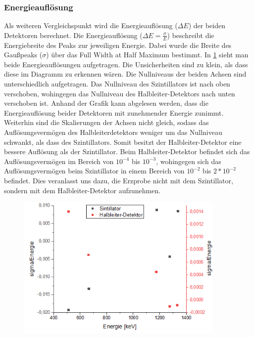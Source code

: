 \subsubsection{Energieauflösung}
Als weiteren Vergleichspunkt wird die Energieauflösung ($\Delta E$) der beiden Detektoren berechnet.
Die Energieauflösung ($\Delta E = \frac{\sigma}{E}$) beschreibt die Energiebreite des Peaks zur jeweiligen Energie. Dabei wurde die Breite des Gaußpeaks ($\sigma$) über das Full Width at Half Maximum bestimmt.
In \cref{sig} sieht man beide Energieauflösungen aufgetragen. Die Unsicherheiten sind zu klein, als dass diese im Diagramm zu erkennen wären.
Die Nullniveaus der beiden Achsen sind unterschiedlich aufgetragen. Das Nullniveau des Szintillators ist nach oben verschoben, wohingegen das Nullniveau des Halbleiter-Detektors nach unten verschoben ist. Anhand der Grafik kann abgelesen werden, dass die Energieauflösung beider Detektoren mit zunehmender Energie zunimmt.
Weiterhin sind die Skalierungen der Achsen nicht gleich, sodass das Auflösungsvermögen des Halbleiterdetektors weniger um das Nullniveau schwankt, als dass des Szintillators. Somit besitzt der Halbleiter-Detektor eine bessere Auflösung als der Szintillator.
Beim Halbleiter-Detektor befindet sich das Auflösungsvermögen im Bereich von $10^{-4}$ bis $10^{-3}$, wohingegen sich das Auflösungsvermögen beim Szintillator in einem Bereich von $10^{-2}$ bis $2*10^{-2}$ befindet.
Dies veranlasst uns dazu, die Erzprobe nicht mit dem Szintillator, sondern mit dem Halbleiter-Detektor aufzunehmen.
\begin{figure}[h!]
	\centering
	\includegraphics[width=0.9\textwidth]{sigma.png}
	\caption{}
	\label{sig}
\end{figure}
